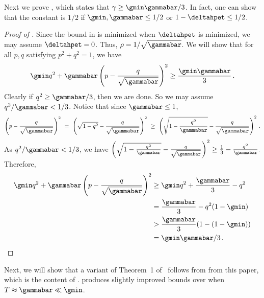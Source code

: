 Next we prove , which states that $\gamma\geq \gmin\gammabar/3$.
In fact, one can show that the constant is $1/2$ if $\gmin,\gammabar\leq 1/2$ or
$1-\deltahpet\leq 1/2$.

%
%
%
\begin{proof}[Proof of ]
Since the bound in  is minimized when 
$\deltahpet$ is minimized, we may assume $\deltahpet=0$.
Thus, $\rho=1/\sqrt{\gammabar}$.  We will show that for all $p,q$
satisfying $p^2+q^2=1$, we have
\[\gmin q^2+\gammabar\left(p - \frac{q}{\sqrt{\gammabar}}\right)^2\geq
\frac{ \gmin\gammabar}{3}\,.\]
Clearly if $q^2\geq \gammabar/3$, then we are done.  So we may assume
$q^2/\gammabar<1/3$.  Notice that since $\gammabar\leq 1$,
\[\left(p - \frac{q}{\sqrt{\gammabar}}\right)^2
~=~ \left(\sqrt{1-q^2} - \frac{q}{\sqrt{\gammabar}}\right)^2
~\geq~ \left(\sqrt{1-\frac{q^2}{\gammabar}} -
\frac{q}{\sqrt{\gammabar}}\right)^2\,.\]
As $q^2/\gammabar<1/3$, we have
$\left(\sqrt{1-\frac{q^2}{\gammabar}} -
\frac{q}{\sqrt{\gammabar}}\right)^2\geq \frac{1}{3} -
\frac{q^2}{\gammabar}.$  Therefore,
\begin{align*}
  \gmin q^2+\gammabar\left(p -  \frac{q}{\sqrt{\gammabar}}\right)^2
  &\geq  \gmin q^2+\frac{\gammabar}{3} -q^2\\
  &= \frac{\gammabar}{3} - q^2(1-\gmin)\\
  &> \frac{\gammabar}{3}(1-(1-\gmin)) \\
  &= \gmin\gammabar/3\,.\qedhere
\end{align*}
\end{proof}
%

Next, we will show that a variant of Theorem~1 of~\cite{jstv04} follows from
 from this paper, which is the content of
.   produces
slightly improved bounds over  when
$T\approx \gammabar\ll \gmin$.  

